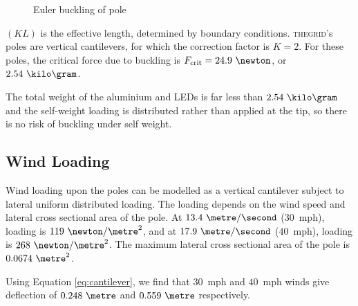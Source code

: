 \documentclass[12pt]{article} %
\newcommand{\thegrid}{\textsc{the\textperiodcentered grid}\xspace}
\begin{document}
\begin{appendices}
\begin{figure}[h]
    \caption{Euler buckling of pole}
\end{figure}

$(KL)$ is the effective length, determined by boundary conditions.  \thegrid's
poles are vertical cantilevers, for which the correction factor is $K=2$.  For
these poles, the critical force due to buckling is $F_{\text{crit}} =
24.9~\newton$, or $2.54~\kilo\gram$.

The total weight of the aluminium and LEDs is far less than $2.54~\kilo\gram$
and the self-weight loading is distributed rather than applied at the tip, so
there is no risk of buckling under self weight.

\subsection{Wind Loading}
Wind loading upon the poles can be modelled as a vertical cantilever subject to
lateral uniform distributed loading.  The loading depends on the wind speed and
lateral cross sectional area of the pole.  At $13.4~\metre/\second$ ($30$~mph),
loading is $119~\newton/\metre^2$, and at $17.9~\metre/\second$ ($40$~mph),
loading is $268~\newton/\metre^2$.  The maximum lateral cross sectional area of
the pole is $0.0674~\metre^2$.

Using Equation \ref{eq:cantilever}, we find that $30$~mph and $40$~mph winds
give deflection of $0.248~\metre$ and $0.559~\metre$ respectively.

\begin{figure}[h]
    \centering
\end{figure}
\end{appendices}
\end{document}
